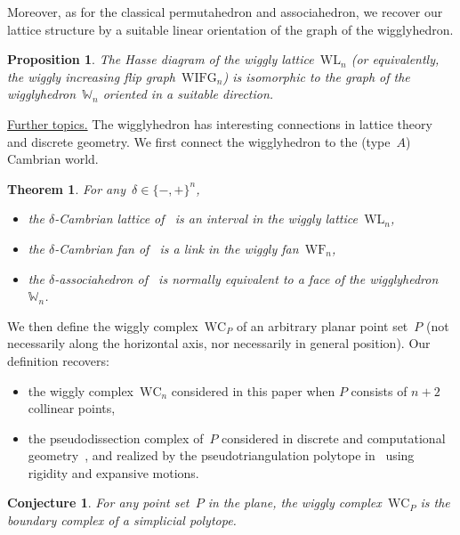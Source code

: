 \documentclass{amsart}
\newtheorem*{theorem*}{Theorem}%
\newtheorem*{proposition*}{Proposition}%
\newtheorem*{conjecture*}{Conjecture}%
\theoremstyle{definition}
\newcommand{\para}[1]{\smallskip\noindent\uline{#1.}} %
\newcommand{\polytope}[1]{\mathds{#1}} %
\newcommand{\wigglyComplex}{\mathrm{WC}} %
\newcommand{\wigglyIncreasingFlipGraph}{\mathrm{WIFG}} %
\newcommand{\wigglyLattice}{\mathrm{WL}} %
\newcommand{\wigglyFan}{\mathrm{WF}} %
\newcommand{\wigglyhedron}{\polytope{W}} %
\begin{document}
Moreover, as for the classical permutahedron and associahedron, we recover our lattice structure by a suitable linear orientation of the graph of the wigglyhedron.

\begin{proposition*}
The Hasse diagram of the wiggly lattice~$\wigglyLattice_n$ (or equivalently, the wiggly increasing flip graph~$\wigglyIncreasingFlipGraph_n$) is isomorphic to the graph of the wigglyhedron~$\wigglyhedron_n$ oriented in a suitable direction.
\end{proposition*}

\para{Further topics}
The wigglyhedron has interesting connections in lattice theory and discrete geometry.
We first connect the wigglyhedron to the (type~$A$) Cambrian world.

\begin{theorem*}
For any~$\delta \in \{-,+\}^n$,
\begin{itemize}
\item the $\delta$-Cambrian lattice of~\cite{Reading-CambrianLattices} is an interval in the wiggly lattice~$\wigglyLattice_n$,
\item the $\delta$-Cambrian fan of~\cite{ReadingSpeyer} is a link in the wiggly fan~$\wigglyFan_n$,
\item the $\delta$-associahedron of~\cite{HohlwegLange} is normally equivalent to a face of the wigglyhedron~$\wigglyhedron_n$.
\end{itemize}
\end{theorem*}

We then define the wiggly complex~$\wigglyComplex_P$ of an arbitrary planar point set~$P$ (not necessarily along the horizontal axis, nor necessarily in general position).
Our definition recovers:
\begin{itemize}
\item the wiggly complex~$\wigglyComplex_n$ considered in this paper when $P$ consists of $n+2$ collinear points,
\item the pseudodissection complex of~$P$ considered in discrete and computational geometry~\cite{PocchiolaVegter,RoteSantosStreinu-pseudotriangulations}, and realized by the pseudotriangulation polytope in~\cite{RoteSantosStreinu-polytope} using rigidity and expansive motions.
\end{itemize}

\begin{conjecture*}
For any point set~$P$ in the plane, the wiggly complex~$\wigglyComplex_P$ is the boundary complex of a simplicial polytope.
\end{conjecture*}
\end{document}
